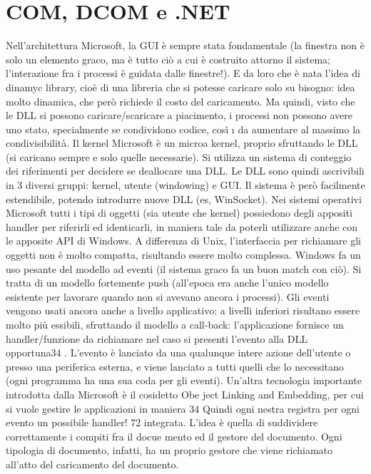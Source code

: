
\section{COM, DCOM e .NET}
Nell'architettura Microsoft, la GUI è sempre stata fondamentale (la finestra non è solo un elemento graco, ma è tutto
ciò a cui è costruito attorno il sistema; l'interazione fra i processi è guidata dalle finestre!). E da loro che è nata
l'idea
di dinamyc library, cioè di una libreria che si potesse caricare solo su bisogno:
idea molto dinamica, che però richiede il costo del caricamento.
Ma quindi, visto che le DLL si possono caricare/scaricare a piacimento, i
processi non possono avere uno stato, specialmente se condividono codice, così
\i{}
da aumentare al massimo la condivisibilità. Il kernel Microsoft è un microa
kernel, proprio sfruttando le DLL (si caricano sempre e solo quelle necessarie).
Si utilizza un sistema di conteggio dei riferimenti per decidere se deallocare una
DLL.
Le DLL sono quindi ascrivibili in 3 diversi gruppi: kernel, utente (windowing) e GUI. Il sistema è però facilmente
estendibile, potendo introdurre nuove
DLL (es, WinSocket).
Nei sistemi operativi Microsoft tutti i tipi di oggetti (sia utente che kernel)
possiedono degli appositi handler per riferirli ed identicarli, in maniera tale da
poterli utilizzare anche con le apposite API di Windows. A differenza di Unix,
l'interfaccia per richiamare gli oggetti non è molto compatta, risultando essere
molto complessa.
Windows fa un uso pesante del modello ad eventi (il sistema graco fa un
buon match con ciò). Si tratta di un modello fortemente push (all'epoca era
anche l'unico modello esistente per lavorare quando non si avevano ancora i
processi). Gli eventi vengono usati ancora anche a livello applicativo: a livelli
inferiori risultano essere molto più essibili, sfruttando il modello a call-back:
l'applicazione fornisce un handler/funzione da richiamare nel caso si presenti
l'evento alla DLL opportuna34 . L'evento è lanciato da una qualunque intere
azione dell'utente o presso una periferica esterna, e viene lanciato a tutti quelli
che lo necessitano (ogni programma ha una sua coda per gli eventi).
Un'altra tecnologia importante introdotta dalla Microsoft è il cosidetto Obe
ject Linking and Embedding, per cui si vuole gestire le applicazioni in maniera
34 Quindi
ogni nestra registra per ogni evento un possibile handler!
72
integrata. L'idea è quella di suddividere correttamente i compiti fra il docue
mento ed il gestore del documento. Ogni tipologia di documento, infatti, ha un
proprio gestore che viene richiamato all'atto del caricamento del documento.
